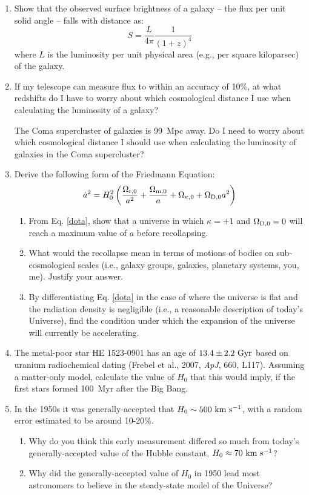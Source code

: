 \documentclass[11pt]{article}
\begin{document}
\begin{enumerate}
\item Show that the observed surface brightness of a galaxy -- the flux per unit solid angle -- falls with distance as:
\begin{equation*}
S = \frac{L}{4\pi}\frac{1}{(1+z)^4}
\end{equation*}
where $L$ is the luminosity per unit physical area (e.g., per square kiloparsec) of the galaxy.

\item If my telescope can measure flux to within an accuracy of 10\%, at what redshifts do I have to worry about which cosmological distance I use when calculating the luminosity of a galaxy?\

The Coma supercluster of galaxies is 99~Mpc away. Do I need to worry about which cosmological distance I should use when calculating the luminosity of galaxies in the Coma supercluster? 

\newpage 
\item Derive the following form of the Friedmann Equation:
\begin{equation}
    \label{dota}
    \dot{a}^2 = H_0^2\left(\frac{\Omega_{\rm r,0}}{a^2}+\frac{\Omega_{\rm m,0}}{a}+\Omega_{\rm \kappa,0}+\Omega_{\rm D,0}a^2\right)
\end{equation}
\begin{enumerate}
\item From Eq. \ref{dota}, show that a universe in which $\kappa=+1$ and $\Omega_{\rm D,0}=0$ will reach a maximum value of $a$ before recollapsing.
\item What would the recollapse mean in terms of motions of bodies on sub-cosmological scales (i.e., galaxy groups, galaxies, planetary systems, you, me). Justify your answer.
\item By differentiating Eq. \ref{dota} in the case of where the universe is flat and the radiation density is negligible (i.e., a reasonable description of today's Universe), find the condition under which the expansion of the universe will currently be accelerating.
\end{enumerate}
\item The metal-poor star HE 1523-0901 has an age of $13.4\pm2.2~{\rm Gyr}$ based on uranium radiochemical dating (Frebel et al., 2007, {\it ApJ}, 660, L117). Assuming a matter-only model, calculate the value of $H_0$ that this would imply, if the first stars formed 100~Myr after the Big Bang.
\item In the 1950s it was generally-accepted that $H_0\sim 500~{\rm km~s^{-1}}$, with a random error estimated to be around 10-20\%.
\begin{enumerate}
\item Why do you think this early measurement differed so much from today's generally-accepted value of the Hubble constant, $H_0\approx70~{\rm km~s^{-1}}$?
\item Why did the generally-accepted value of $H_0$ in 1950 lead most astronomers to believe in the steady-state model of the Universe?
\end{enumerate}

\end{enumerate}
\end{document}
